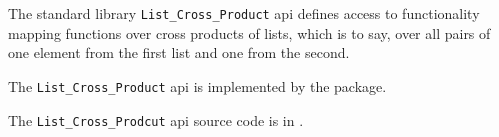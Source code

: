 
The standard library {\tt List\_Cross\_Product} api defines access to functionality 
mapping functions over cross products of lists, which is to say, over all pairs of 
one element from the first list and one from the second.

The {\tt List\_Cross\_Product} api is implemented by the  package.

The {\tt List\_Cross\_Prodcut} api source code is in .

